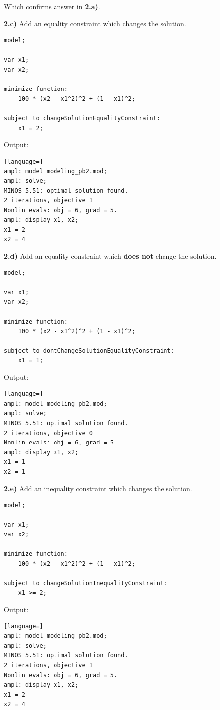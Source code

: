 Which confirms answer in \textbf{2.a)}.

\textbf{2.c)}  Add an equality constraint which changes the solution.
\begin{lstlisting}
model;

var x1;
var x2;

minimize function:
	100 * (x2 - x1^2)^2 + (1 - x1)^2;
	
subject to changeSolutionEqualityConstraint:
	x1 = 2;
\end{lstlisting}

Output:

\begin{lstlisting}[language=]
ampl: model modeling_pb2.mod;
ampl: solve;
MINOS 5.51: optimal solution found.
2 iterations, objective 1
Nonlin evals: obj = 6, grad = 5.
ampl: display x1, x2;
x1 = 2
x2 = 4
\end{lstlisting}

\textbf{2.d)}  Add an equality constraint which \textbf{does not} change the solution.
\begin{lstlisting}
model;

var x1;
var x2;

minimize function:
	100 * (x2 - x1^2)^2 + (1 - x1)^2;
	
subject to dontChangeSolutionEqualityConstraint:
	x1 = 1;
\end{lstlisting}

Output:

\begin{lstlisting}[language=]
ampl: model modeling_pb2.mod;
ampl: solve;
MINOS 5.51: optimal solution found.
2 iterations, objective 0
Nonlin evals: obj = 6, grad = 5.
ampl: display x1, x2;
x1 = 1
x2 = 1
\end{lstlisting}


\textbf{2.e)}  Add an inequality constraint which changes the solution.
\begin{lstlisting}
model;

var x1;
var x2;

minimize function:
	100 * (x2 - x1^2)^2 + (1 - x1)^2;
	
subject to changeSolutionInequalityConstraint:
	x1 >= 2;
\end{lstlisting}

Output:

\begin{lstlisting}[language=]
ampl: model modeling_pb2.mod;
ampl: solve;
MINOS 5.51: optimal solution found.
2 iterations, objective 1
Nonlin evals: obj = 6, grad = 5.
ampl: display x1, x2;
x1 = 2
x2 = 4
\end{lstlisting}

